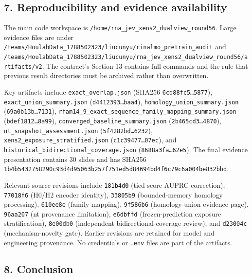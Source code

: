 \documentclass[
  11pt]{article}
\begin{document}
\hypertarget{7-reproducibility-and-evidence-availability}{%
\subsection{7. Reproducibility and evidence
availability}\label{7-reproducibility-and-evidence-availability}}

The main code workspace is
\texttt{/home/rna\_jev\_xens2\_dualview\_round56}. Large evidence files
are under
\texttt{/teams/HoulabData\_1788502323/liucunyu/rinalmo\_pretrain\_audit}
and
\texttt{/teams/HoulabData\_1788502323/liucunyu/rna\_jev\_xens2\_dualview\_round56/artifacts/v2}.
The contract's Section 13 contains full commands and the rule that
previous result directories must be archived rather than overwritten.

Key artifacts include \texttt{exact\_overlap.json} (SHA256
\texttt{6cd88fc5\ldots{}5877}), \texttt{exact\_union\_summary.json}
(\texttt{d4412393\ldots{}baa4}), \texttt{homology\_union\_summary.json}
(\texttt{69a0b13b\ldots{}7131}),
\texttt{rfam14\_9\_exact\_sequence\_family\_mapping\_summary.json}
(\texttt{bdef1812\ldots{}8a99}),
\texttt{converged\_baseline\_summary.json}
(\texttt{2b465cd3\ldots{}4870}), \texttt{nt\_snapshot\_assessment.json}
(\texttt{5f4282bd\ldots{}6232}),
\texttt{xens2\_exposure\_stratified.json}
(\texttt{c1c39477\ldots{}07ec}), and
\texttt{historical\_bidirectional\_coverage.json}
(\texttt{8688a3fa\ldots{}62e5}). The final evidence presentation
contains 30 slides and has SHA256
\texttt{1b4b5432758290c93d4d95063b257f751ed5d84694bd4f6c79c6a004be832bbd}.

Relevant source revisions include \texttt{181b4d0} (tied-score AUPRC
correction), \texttt{77018f6} (H0/H2 encoder identity), \texttt{33805b9}
(bounded-memory homology processing), \texttt{610ee8e} (family mapping),
\texttt{9f586b6} (homology-union evidence page), \texttt{96aa207} (nt
provenance limitation), \texttt{e6dbffd} (frozen-prediction exposure
stratification), \texttt{8e00db0} (independent bidirectional-coverage
review), and \texttt{d23004c} (mechanism-novelty gate). Earlier
revisions are retained for model and engineering provenance. No
credentials or \texttt{.env} files are part of the artifacts.

\hypertarget{8-conclusion}{%
\subsection{8. Conclusion}\label{8-conclusion}}
\end{document}
